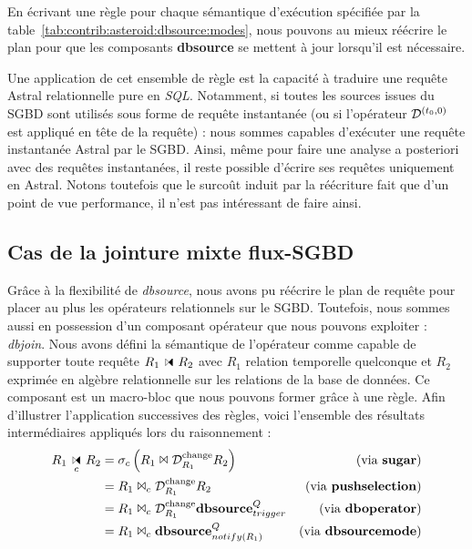 En écrivant une règle pour chaque sémantique d'exécution spécifiée par la table~\ref{tab:contrib:asteroid:dbsource:modes}, nous pouvons au mieux réécrire le plan pour que les composants \textbf{dbsource} se mettent à jour lorsqu'il est nécessaire.

Une application de cet ensemble de règle est la capacité à traduire une requête Astral relationnelle pure en \textit{SQL}. Notamment, si toutes les sources issues du SGBD sont utilisés sous forme de requête instantanée (ou si l'opérateur $\mathcal{D}^{(t_0,0)}$ est appliqué en tête de la requête) : nous sommes capables d'exécuter une requête instantanée Astral par le SGBD. Ainsi, même pour faire une analyse a posteriori avec des requêtes instantanées, il reste possible d'écrire ses requêtes uniquement en Astral. Notons toutefois que le surcoût induit par la réécriture fait que d'un point de vue performance, il n'est pas intéressant de faire ainsi.

\subsection{Cas de la jointure mixte flux-SGBD}\label{sec:contrib:asteroid:reecriture:join}
Grâce à la flexibilité de \textit{dbsource}, nous avons pu réécrire le plan de requête pour placer au plus les opérateurs relationnels sur le SGBD. Toutefois, nous sommes aussi en possession d'un composant opérateur que nous pouvons exploiter : \textit{dbjoin}. Nous avons défini la sémantique de l'opérateur comme capable de supporter toute requête $R_1\ssjoin R_2$ avec $R_1$ relation temporelle quelconque et $R_2$ exprimée en algèbre relationnelle sur les relations de la base de données. Ce composant est un macro-bloc que nous pouvons former grâce à une règle. Afin d'illustrer l'application successives des règles, voici l'ensemble des résultats intermédiaires appliqués lors du raisonnement :
\begin{align*} 
R_1\ssjoin_c R_2 &= \sigma_c \left(R_1 \Join \D^{\mathrm{change}}_{R_1} R_2\right) & \text{(via \textbf{sugar})}\\
& =  R_1 \Join_c \D^{\mathrm{change}}_{R_1} R_2 & \text{(via \textbf{pushselection})}\\
& =  R_1 \Join_c \D^{\mathrm{change}}_{R_1} \textbf{dbsource}_{trigger}^{Q} & \text{(via \textbf{dboperator})}\\
& =  R_1 \Join_c \textbf{dbsource}_{notify(R_1)}^{Q} & \text{(via \textbf{dbsourcemode})}
\end{align*}

